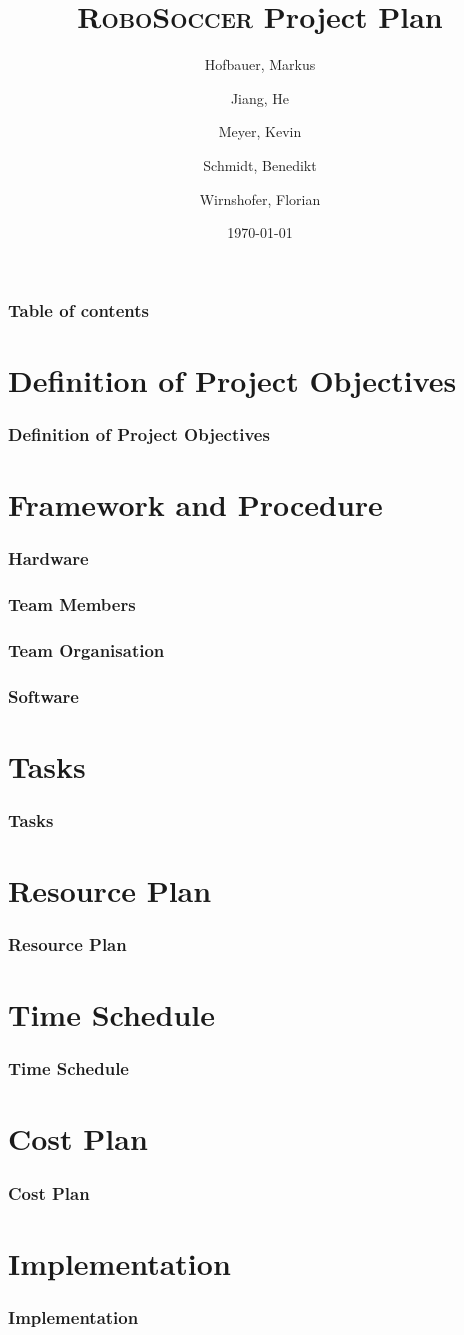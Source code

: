 \documentclass[hyperref={pdfpagelabels=false}]{beamer}
\title{\textsc{RoboSoccer} Project Plan}
\author{
  Hofbauer, Markus\\
  \and
  Jiang, He \\
  \and
  Meyer, Kevin\\
  \and
  Schmidt, Benedikt\\
  \and
  Wirnshofer, Florian
}
\date{\today}
\begin{document}
\begin{frame}
\titlepage
\end{frame} 

%
\begin{frame}
\frametitle{Table of contents}
\tableofcontents
\end{frame} 

\section{Definition of Project Objectives} 
\begin{frame}
	\frametitle{Definition of Project Objectives} 
\end{frame}

\section{Framework and Procedure} 
\begin{frame}
	\frametitle{Hardware} 
\end{frame}

\begin{frame}
	\frametitle{Team Members} 
\end{frame}

\begin{frame}
	\frametitle{Team Organisation} 
\end{frame}

\begin{frame}
	\frametitle{Software} 
\end{frame}


\section{Tasks} 
\begin{frame}
	\frametitle{Tasks} 
\end{frame}


\section{Resource Plan} 
\begin{frame}
	\frametitle{Resource Plan} 
\end{frame}


\section{Time Schedule} 
\begin{frame}
	\frametitle{Time Schedule} 
\end{frame}

\section{Cost Plan} 
\begin{frame}
	\frametitle{Cost Plan} 
\end{frame}

\section{Implementation} 
\begin{frame}
	\frametitle{Implementation} 
\end{frame}
\end{document}
